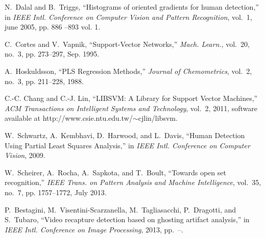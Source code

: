 \documentclass[journal]{IEEEtran}
\begin{document}
\begin{thebibliography}{10}
N.~Dalal and B.~Triggs, ``Histograms of oriented gradients for human
  detection,'' in \emph{IEEE Intl. Conference on Computer Vision and Pattern
  Recognition}, vol.~1, june 2005, pp. 886 --893 vol. 1.

C.~Cortes and V.~Vapnik, ``{Support-Vector Networks},'' \emph{Mach. Learn.},
  vol.~20, no.~3, pp. 273--297, Sep. 1995.

A.~Hoskuldsson, ``{PLS Regression Methods},'' \emph{Journal of Chemometrics},
  vol.~2, no.~3, pp. 211--228, 1988.

C.-C. Chang and C.-J. Lin, ``{LIBSVM: A Library for Support Vector Machines},''
  \emph{ACM Transactions on Intelligent Systems and Technology}, vol.~2, 2011,
  software available at http://www.csie.ntu.edu.tw/$\sim$cjlin/libsvm.

W.~Schwartz, A.~Kembhavi, D.~Harwood, and L.~Davis, ``{Human Detection Using
  Partial Least Squares Analysis},'' in \emph{IEEE Intl. Conference on Computer
  Vision}, 2009.

W.~Scheirer, A.~Rocha, A.~Sapkota, and T.~Boult, ``Towards open set
  recognition,'' \emph{IEEE Trans. on Pattern Analysis and Machine
  Intelligence}, vol.~35, no.~7, pp. 1757--1772, July 2013.

P.~Bestagini, M.~Visentini-Scarzanella, M.~Tagliasacchi, P.~Dragotti, and
  S.~Tubaro, ``Video recapture detection based on ghosting artifact analysis,''
  in \emph{IEEE Intl. Conference on Image Processing}, 2013, pp.~--.

\end{thebibliography}
\end{document}
